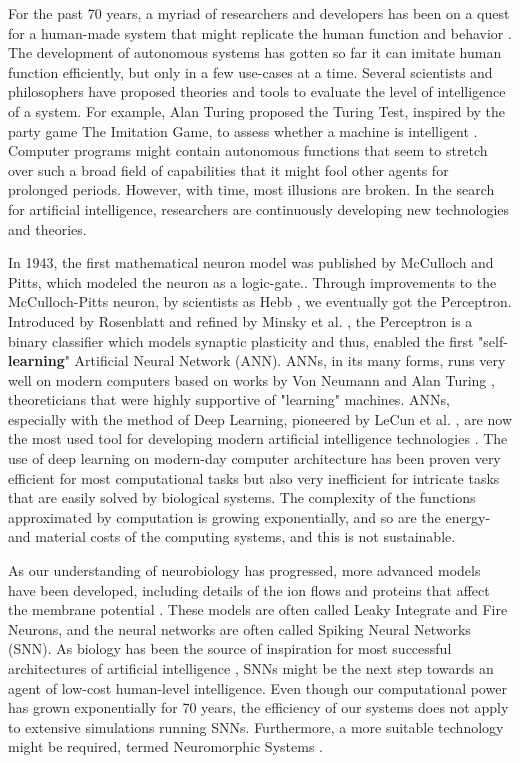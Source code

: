 For the past 70 years, a myriad of researchers and developers has been on a quest for a human-made system that might replicate the human function and behavior \cite{haenlein_brief_2019}.
The development of autonomous systems has gotten so far it can imitate human function efficiently, but only in a few use-cases at a time.
Several scientists and philosophers have proposed theories and tools to evaluate the level of intelligence of a system.
For example, Alan Turing proposed the Turing Test, inspired by the party game The Imitation Game, to assess whether a machine is intelligent \cite{turing_computing_2009}.
Computer programs might contain autonomous functions that seem to stretch over such a broad field of capabilities
that it might fool other agents for prolonged periods. However, with time, most illusions are broken.
In the search for artificial intelligence, researchers are continuously developing new technologies and theories.

In 1943, the first mathematical neuron model was published by McCulloch and Pitts, which modeled the neuron as a logic-gate.\cite{cowan_discussion_1990}.
Through improvements to the McCulloch-Pitts neuron, by scientists as Hebb \cite{brown_legacy_2003}, we eventually got the Perceptron.
Introduced by Rosenblatt \cite{rosenblatt_perceptron_1958} and refined by Minsky et al. \cite{minsky_perceptrons_2017}, the Perceptron is a binary classifier which models synaptic plasticity and thus, enabled the first "self-\textbf{learning}" Artificial Neural Network (ANN).
ANNs, in its many forms, runs very well on modern computers based on works by Von Neumann and Alan Turing \cite{von_neumann_first_1993}, theoreticians that were highly supportive of "learning" machines. ANNs, especially with the method of Deep Learning, pioneered by LeCun et al. \cite{lecun_gradient-based_1998}, are now the most used tool for developing modern artificial intelligence technologies \cite{haenlein_brief_2019}. The use of deep learning on modern-day computer architecture has been proven very efficient for most computational tasks but also very inefficient for intricate tasks that are easily solved by biological systems.
The complexity of the functions approximated by computation is growing exponentially, and so are the energy- and material costs of the computing systems, and this is not sustainable.

As our understanding of neurobiology has progressed, more advanced models have been developed, including details of the ion flows and proteins that affect the membrane potential \cite{burkitt_review_2006}.
These models are often called Leaky Integrate and Fire Neurons, and the neural networks are often called Spiking Neural Networks (SNN). As biology has been the source of inspiration for most successful architectures of artificial intelligence \cite{minsky_perceptrons_2017}, SNNs might be the next step towards an agent of low-cost human-level intelligence.
Even though our computational power has grown exponentially for 70 years, the efficiency of our systems does not apply to extensive simulations running SNNs.
Furthermore, a more suitable technology might be required, termed Neuromorphic Systems \cite{furber_large-scale_2016}\cite{schuman_survey_2017}.


